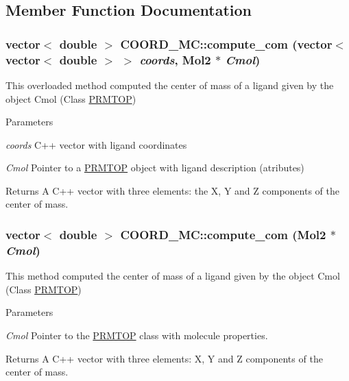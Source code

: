 \subsection{Member Function Documentation}
\hypertarget{classCOORD__MC_ac77f14f3b04611c7bf46915a53792116}{
\subsubsection[{compute\_\-com}]{\setlength{\rightskip}{0pt plus 5cm}vector$<$ double $>$ COORD\_\-MC::compute\_\-com (vector$<$ vector$<$ double $>$ $>$ {\em coords}, \/  {\bf Mol2} $\ast$ {\em Cmol})}}
\label{classCOORD__MC_ac77f14f3b04611c7bf46915a53792116}
This overloaded method computed the center of mass of a ligand given by the object Cmol (Class \hyperlink{classPRMTOP}{PRMTOP}) 
\begin{DoxyParams}{Parameters}
\item[{\em coords}]C++ vector with ligand coordinates \item[{\em Cmol}]Pointer to a \hyperlink{classPRMTOP}{PRMTOP} object with ligand description (atributes) \end{DoxyParams}
\begin{DoxyReturn}{Returns}
A C++ vector with three elements: the X, Y and Z components of the center of mass. 
\end{DoxyReturn}
\hypertarget{classCOORD__MC_add97b29900401a44464b400267076544}{
\subsubsection[{compute\_\-com}]{\setlength{\rightskip}{0pt plus 5cm}vector$<$ double $>$ COORD\_\-MC::compute\_\-com ({\bf Mol2} $\ast$ {\em Cmol})}}
\label{classCOORD__MC_add97b29900401a44464b400267076544}
This method computed the center of mass of a ligand given by the object Cmol (Class \hyperlink{classPRMTOP}{PRMTOP}) 
\begin{DoxyParams}{Parameters}
\item[{\em Cmol}]Pointer to the \hyperlink{classPRMTOP}{PRMTOP} class with molecule properties. \end{DoxyParams}
\begin{DoxyReturn}{Returns}
A C++ vector with three elements: X, Y and Z components of the center of mass. 
\end{DoxyReturn}
